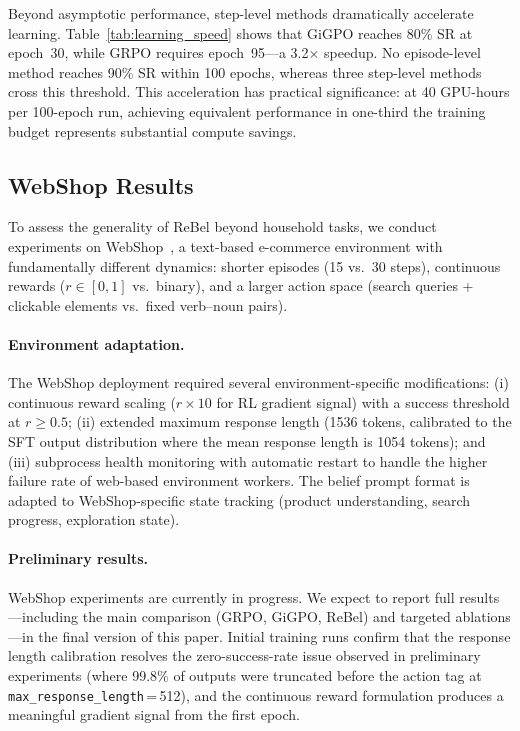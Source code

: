 Beyond asymptotic performance, step-level methods dramatically accelerate learning.
Table~\ref{tab:learning_speed} shows that GiGPO reaches 80\% SR at epoch~30,
while GRPO requires epoch~95---a 3.2$\times$ speedup.
No episode-level method reaches 90\% SR within 100 epochs, whereas three step-level
methods cross this threshold.
This acceleration has practical significance: at 40 GPU-hours per 100-epoch run,
achieving equivalent performance in one-third the training budget represents
substantial compute savings.


\subsection{WebShop Results}
\label{sec:webshop_results}

To assess the generality of ReBel beyond household tasks, we conduct experiments
on WebShop~\citep{yao2022webshop}, a text-based e-commerce environment with
fundamentally different dynamics: shorter episodes (15 vs.\ 30 steps), continuous
rewards ($r \in [0,1]$ vs.\ binary), and a larger action space (search queries +
clickable elements vs.\ fixed verb--noun pairs).

\paragraph{Environment adaptation.}
The WebShop deployment required several environment-specific modifications:
(i) continuous reward scaling ($r \times 10$ for RL gradient signal) with a
success threshold at $r \geq 0.5$;
(ii) extended maximum response length (1536 tokens, calibrated to the SFT
output distribution where the mean response length is 1054 tokens);
and (iii) subprocess health monitoring with automatic restart to handle the
higher failure rate of web-based environment workers.
The belief prompt format is adapted to WebShop-specific state tracking
(product understanding, search progress, exploration state).

\paragraph{Preliminary results.}
WebShop experiments are currently in progress.
We expect to report full results---including the main comparison (GRPO, GiGPO,
ReBel) and targeted ablations---in the final version of this paper.
Initial training runs confirm that the response length calibration resolves
the zero-success-rate issue observed in preliminary experiments
(where 99.8\% of outputs were truncated before the action tag at
\texttt{max\_response\_length}\,=\,512), and the continuous reward formulation
produces a meaningful gradient signal from the first epoch.


